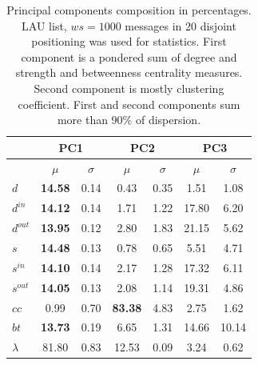 \documentclass[%
 aip,
 jmp,%
 amsmath,amssymb,
 reprint,%
]{revtex4-1}
\begin{document}
\begin{table}
  \centering
  \caption{Principal components composition in percentages. LAU list, $ws=1000$ messages in 20 disjoint positioning was used for statistics. First component is a pondered sum of degree and strength and betweenness centrality measures. Second component is mostly clustering coefficient. First and second components sum more than 90\% of dispersion.}
  \begin{tabular}{|l|c|c| c|c| c|c|}\hline
 & \multicolumn{2}{c|}{PC1} & \multicolumn{2}{c|}{PC2} & \multicolumn{2}{c|}{PC3}  \\\hline
       & $\mu$ & $\sigma$ & $\mu$ & $\sigma$ & $\mu$ & $\sigma$  \\\hline
$d$       & {\bf 14.58} & 0.14 & 0.43  & 0.35 & 1.51  & 1.08 \\
$d^{in}$  & {\bf 14.12} & 0.14 & 1.71  & 1.22 & 17.80 & 6.20 \\
$d^{out}$ & {\bf 13.95} & 0.12 & 2.80  & 1.83 & 21.15 & 5.62 \\
$s$       & {\bf 14.48} & 0.13 & 0.78  & 0.65 & 5.51  & 4.71 \\ 
$s^{in}$  & {\bf 14.10} & 0.14 & 2.17  & 1.28 & 17.32 & 6.11 \\ 
$s^{out}$ & {\bf 14.05} & 0.13 & 2.08  & 1.14 & 19.31 & 4.86 \\ \hline
$cc$      & 0.99        & 0.70 & {\bf 83.38} & 4.83 & 2.75  & 1.62 \\ 
$bt$      & {\bf 13.73} & 0.19 & 6.65  & 1.31 & 14.66 & 10.14 \\ \hline
$\lambda$ & 81.80 & 0.83 & 12.53 & 0.09  & 3.24 & 0.62 \\ \hline
  \end{tabular}
  \label{compPCA}
\end{table}
\end{document}
